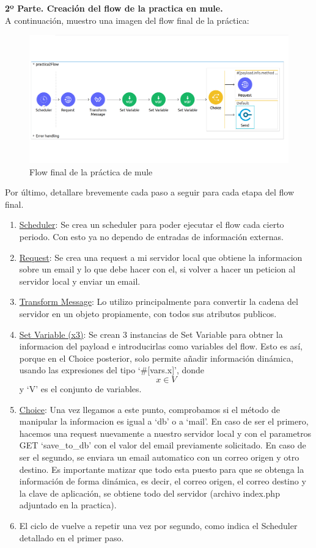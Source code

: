 \documentclass{article}
\begin{document}
\textbf{2º Parte. Creación del flow de la practica en mule.}\\
A continuación, muestro una imagen del flow final de la práctica:\\
\begin{figure}[H]
\centering
\includegraphics[width=0.7\linewidth]{./mule}
\caption{Flow final de la práctica de mule}
\end{figure}

Por último, detallare brevemente cada paso a seguir para cada etapa del flow final.
\\
\begin{enumerate}
    \item \underline{Scheduler}: Se crea un scheduler para poder ejecutar el flow cada cierto periodo. Con esto
          ya no dependo de entradas de información externas.
    \item \underline{Request}: Se crea una request a mi servidor local que obtiene la informacion sobre un email
          y lo que debe hacer con el, si volver a hacer un peticion al servidor local y enviar un email.
    \item \underline{Transform Message}: Lo utilizo principalmente para convertir la cadena del servidor en un objeto
          propiamente, con todos sus atributos publicos.
    \item \underline{Set Variable (x3)}: Se crean 3 instancias de Set Variable para obtner la informacion del payload e
          introducirlas como variables del flow. Esto es así, porque en el Choice posterior, solo permite
          añadir información dinámica, usando las expresiones del tipo `\#[vars.x]', donde \[ x \in V \] y
          `V' es el conjunto de variables.
    \item \underline{Choice}: Una vez llegamos a este punto, comprobamos si el método de manipular la informacion es igual
          a `db' o a `mail'. En caso de ser el primero, hacemos una request nuevamente a nuestro servidor local
          y con el parametros GET `save\_to\_db' con el valor del email previamente solicitado. En caso de ser el
          segundo, se enviara un email automatico con un correo origen y otro destino. Es importante matizar que
          todo esta puesto para que se obtenga la información de forma dinámica, es decir, el correo origen,
          el correo destino y la clave de aplicación, se obtiene todo del servidor (archivo index.php adjuntado
          en la practica).
    \item El ciclo de vuelve a repetir una vez por segundo, como indica el Scheduler detallado en el primer paso.
\end{enumerate}
\end{document}
